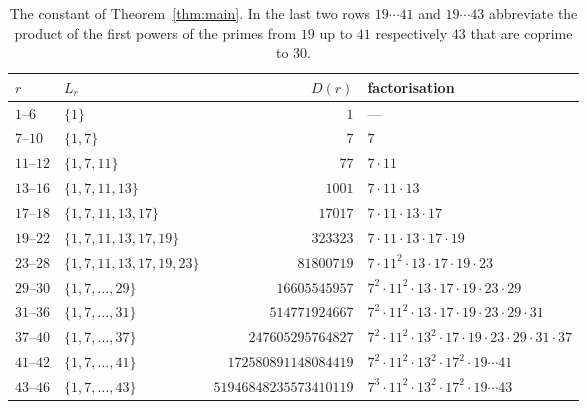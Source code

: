 \documentclass[11pt]{article}
\theoremstyle{plain}
\theoremstyle{definition}
\theoremstyle{remark}
\numberwithin{equation}{section}
\newcommand{\Lr}{L_r}
\begin{document}
\begin{table}[ht]
\centering
\small
\begin{tabular}{@{}llrl@{}}
\toprule
$r$ & $\Lr$ & $D(r)$ & factorisation \\
\midrule
$1$--$6$   & $\{1\}$                                  & $1$ & --- \\
$7$--$10$  & $\{1,7\}$                                & $7$ & $7$ \\
$11$--$12$ & $\{1,7,11\}$                             & $77$ & $7\cdot 11$ \\
$13$--$16$ & $\{1,7,11,13\}$                          & $1001$ & $7\cdot 11\cdot 13$ \\
$17$--$18$ & $\{1,7,11,13,17\}$                       & $17017$ & $7\cdot 11\cdot 13\cdot 17$ \\
$19$--$22$ & $\{1,7,11,13,17,19\}$                    & $323323$ & $7\cdot 11\cdot 13\cdot 17\cdot 19$ \\
$23$--$28$ & $\{1,7,11,13,17,19,23\}$                 & $81800719$ & $7\cdot 11^{2}\cdot 13\cdot 17\cdot 19\cdot 23$ \\
$29$--$30$ & $\{1,7,\dots,29\}$                       & $16605545957$ & $7^{2}\cdot 11^{2}\cdot 13\cdot 17\cdot 19\cdot 23\cdot 29$ \\
$31$--$36$ & $\{1,7,\dots,31\}$                       & $514771924667$ & $7^{2}\cdot 11^{2}\cdot 13\cdot 17\cdot 19\cdot 23\cdot 29\cdot 31$ \\
$37$--$40$ & $\{1,7,\dots,37\}$                       & $247605295764827$ & $7^{2}\cdot 11^{2}\cdot 13^{2}\cdot 17\cdot 19\cdot 23\cdot 29\cdot 31\cdot 37$ \\
$41$--$42$ & $\{1,7,\dots,41\}$                       & $172580891148084419$ & $7^{2}\cdot 11^{2}\cdot 13^{2}\cdot 17^{2}\cdot 19\cdots 41$ \\
$43$--$46$ & $\{1,7,\dots,43\}$                       & $51946848235573410119$ & $7^{3}\cdot 11^{2}\cdot 13^{2}\cdot 17^{2}\cdot 19\cdots 43$ \\
\bottomrule
\end{tabular}
\caption{The constant of Theorem~\ref{thm:main}. In the last two rows $19\cdots41$ and
$19\cdots43$ abbreviate the product of the first powers of the primes from $19$ up to $41$
respectively $43$ that are coprime to $30$.}
\label{tab:Dr}
\end{table}
\end{document}
